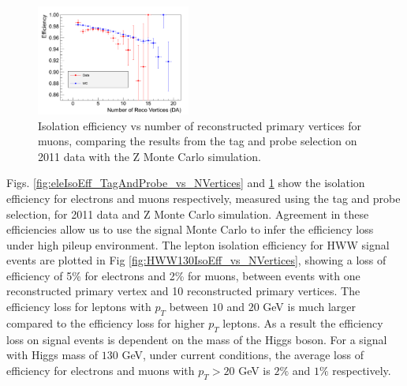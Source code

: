 \begin{figure}[!htbp]
\begin{center}
\includegraphics[width=0.45\textwidth]{figures/MuonIsolationEffVsNVertices_TagAndProbe.pdf}
\caption{Isolation efficiency vs number of reconstructed primary vertices for muons, comparing the 
results from the tag and probe selection on 2011 data with the Z Monte Carlo simulation.}
\label{fig:muIsoEff_TagAndProbe_vs_NVertices}
\end{center}
\end{figure}

Figs. \ref{fig:eleIsoEff_TagAndProbe_vs_NVertices} and \ref{fig:muIsoEff_TagAndProbe_vs_NVertices} 
show the isolation efficiency for electrons and muons respectively, measured using the
tag and probe selection, for 2011 data and Z Monte Carlo simulation. Agreement in these
efficiencies allow us to use the signal Monte Carlo to infer the efficiency loss under 
high pileup environment. The lepton isolation efficiency for HWW signal events are plotted
in Fig \ref{fig:HWW130IsoEff_vs_NVertices}, showing a loss of efficiency of 5\% for 
electrons and 2\% for muons, between events with one reconstructed primary vertex
and 10 reconstructed primary vertices. The efficiency loss for leptons with $p_{T}$ 
between $10$ and $20$ GeV is much larger compared to the efficiency loss for higher
$p_{T}$ leptons. As a result the efficiency loss on signal events is dependent 
on the mass of the Higgs boson. For a signal with Higgs mass of $130$ GeV, 
under current conditions,
the average loss of efficiency for electrons and muons with $p_{T}>20$ GeV is
$2\%$ and $1\%$ respectively. 



